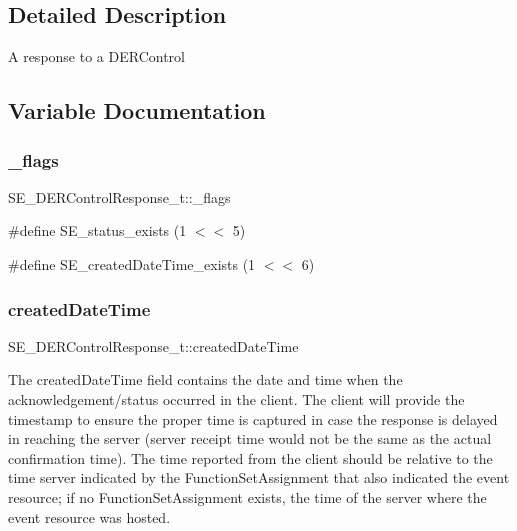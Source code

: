 \subsection{Detailed Description}
A response to a D\+E\+R\+Control 

\subsection{Variable Documentation}
\mbox{\label{group__DERControlResponse_gae6670b4ecc86324d6b218d9761fdae53}} 
\subsubsection{\texorpdfstring{\+\_\+flags}{\_flags}}
{\footnotesize\ttfamily S\+E\+\_\+\+D\+E\+R\+Control\+Response\+\_\+t\+::\+\_\+flags}

\#define S\+E\+\_\+status\+\_\+exists (1 $<$$<$ 5)

\#define S\+E\+\_\+created\+Date\+Time\+\_\+exists (1 $<$$<$ 6) \mbox{\label{group__DERControlResponse_ga0914ccbb8b4cd078cbc81028492b4f32}} 
\subsubsection{\texorpdfstring{created\+Date\+Time}{createdDateTime}}
{\footnotesize\ttfamily S\+E\+\_\+\+D\+E\+R\+Control\+Response\+\_\+t\+::created\+Date\+Time}

The created\+Date\+Time field contains the date and time when the acknowledgement/status occurred in the client. The client will provide the timestamp to ensure the proper time is captured in case the response is delayed in reaching the server (server receipt time would not be the same as the actual confirmation time). The time reported from the client should be relative to the time server indicated by the Function\+Set\+Assignment that also indicated the event resource; if no Function\+Set\+Assignment exists, the time of the server where the event resource was hosted. \mbox{\label{group__DERControlResponse_gaacc63347ab9a7861f4a46bd2b8d9106d}} 
